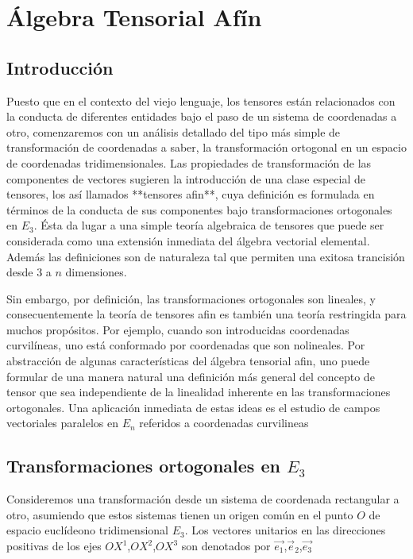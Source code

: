 
\setchapterpreamble[u]{\margintoc}
\chapter{Álgebra Tensorial Afín}

\section{Introducción}

Puesto que en el contexto del viejo lenguaje, los tensores están relacionados con la conducta de diferentes entidades bajo el paso de un sistema de coordenadas a otro, comenzaremos con un análisis detallado del tipo más simple de transformación de coordenadas a saber, la transformación ortogonal en un espacio de coordenadas tridimensionales. Las propiedades de transformación de las componentes de vectores sugieren la introducción de una clase especial de tensores, los así llamados  **tensores afin**, cuya definición es formulada en términos de la conducta de sus componentes bajo transformaciones ortogonales en $E_3$. Ésta da lugar a una simple teoría algebraica de tensores que puede ser considerada como una extensión inmediata del álgebra vectorial elemental. Además las definiciones son de naturaleza tal que permiten una exitosa trancisión desde 3 a $n$ dimensiones.

Sin embargo, por definición, las transformaciones ortogonales son lineales, y consecuentemente la teoría de tensores afin es también una teoría restringida para muchos propósitos. Por ejemplo, cuando son introducidas coordenadas curvilíneas, uno está conformado por coordenadas que son nolineales. Por abstracción de algunas características del álgebra tensorial afin, uno puede formular de una manera natural una definición más general del concepto de tensor que sea independiente de la linealidad inherente en las transformaciones ortogonales. Una aplicación inmediata de estas ideas es el estudio de campos vectoriales paralelos en $E_n$ referidos a coordenadas curvilineas

\section{Transformaciones ortogonales en $E_3$}

Consideremos una transformación desde un sistema de coordenada rectangular a otro, asumiendo que estos sistemas tienen un origen común en el punto $O$ de espacio euclídeono tridimensional $E_3$. Los vectores unitarios en las direcciones positivas de los ejes $OX^1$,$OX^2$,$OX^3$ son denotados por $\vec{e_1}$,$\vec{e}_2$,$\vec{e_3}$

